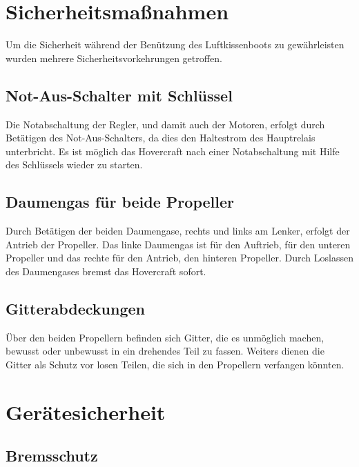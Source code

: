 
\section{Sicherheitsmaßnahmen}
Um die Sicherheit während der Benützung des Luftkissenboots zu gewährleisten wurden mehrere Sicherheitsvorkehrungen getroffen.
\subsection{Not-Aus-Schalter mit Schlüssel}
Die Notabschaltung der Regler, und damit auch der Motoren, erfolgt durch Betätigen des Not-Aus-Schalters, da dies den Haltestrom des Hauptrelais unterbricht. 
Es ist möglich das Hovercraft nach einer Notabschaltung mit Hilfe des Schlüssels wieder zu starten. 

\subsection{Daumengas für beide Propeller}
Durch Betätigen der beiden Daumengase, rechts und links am Lenker, erfolgt der Antrieb der Propeller. Das linke Daumengas ist für den Auftrieb, für den unteren Propeller und
das rechte für den Antrieb, den hinteren Propeller. Durch Loslassen des Daumengases bremst das Hovercraft sofort.

\subsection{Gitterabdeckungen}
Über den beiden Propellern befinden sich Gitter, die es unmöglich machen, bewusst oder unbewusst in ein drehendes Teil zu fassen. 
Weiters dienen die Gitter als Schutz vor losen Teilen, die sich in den Propellern verfangen könnten. 

\section{Gerätesicherheit}

\subsection{Bremsschutz}